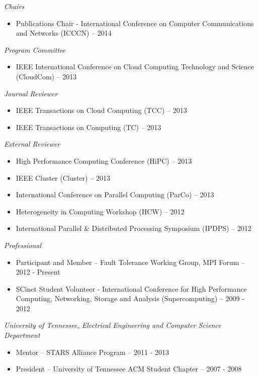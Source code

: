 {\sl Chairs}
\begin{itemize}
    \item Publications Chair - International Conference on Computer
        Communications and Networks (ICCCN) -- 2014
\end{itemize}

{\sl Program Committee}
\begin{itemize}
    \item IEEE International Conference on Cloud Computing Technology and
        Science (CloudCom) -- 2013
\end{itemize}

{\sl Journal Reviewer}
\begin{itemize}
    \item IEEE Transactions on Cloud Computing (TCC) -- 2013
    \item IEEE Transactions on Computing (TC) -- 2013
\end{itemize}

{\sl External Reviewer}
\begin{itemize}
    \item High Performance Computing Conference (HiPC) -- 2013
    \item IEEE Cluster (Cluster) -- 2013
    \item International Conference on Parallel Computing (ParCo) -- 2013
    \item Heterogeneity in Computing Workshop (HCW) -- 2012
    \item International Parallel \& Distributed Processing Symposium (IPDPS) -- 2012
\end{itemize}

{\sl Professional}
\begin{itemize}
    \item Participant and Member -- Fault Tolerance Working Group, MPI Forum -- 2012 - Present
    \item SCinet Student Volunteer - International Conference for High
        Performance Computing, Networking, Storage and Analysis
        (Supercomputing) -- 2009 - 2012
\end{itemize}

{\sl University of Tennessee, Electrical Engineering and Computer Science Department}
\begin{itemize}
    \item Mentor -- STARS Alliance Program -- 2011 - 2013
    \item President -- University of Tennessee ACM Student Chapter -- 2007 - 2008
\end{itemize}
